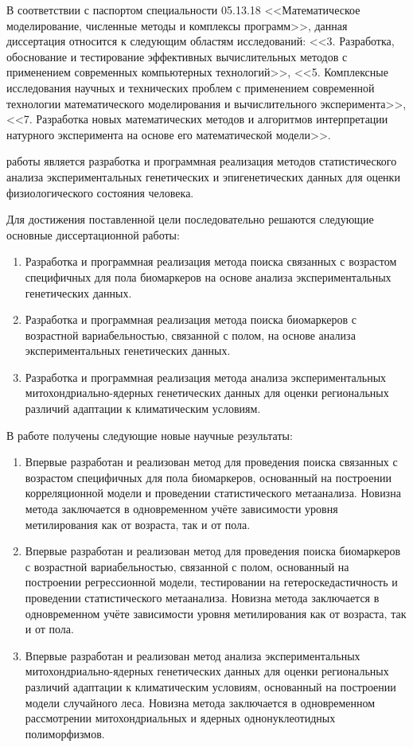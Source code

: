 В соответствии с паспортом специальности 05.13.18 <<Математическое моделирование, численные методы и комплексы программ>>, данная диссертация относится к следующим областям исследований: <<3. Разработка, обоснование и тестирование эффективных вычислительных методов с применением современных компьютерных технологий>>, <<5. Комплексные исследования научных и технических проблем с применением современной технологии математического моделирования и вычислительного эксперимента>>, <<7. Разработка новых математических методов и алгоритмов интерпретации натурного эксперимента на основе его математической модели>>.

{\aim} работы является разработка и программная реализация методов статистического анализа экспериментальных генетических и эпигенетических данных для оценки физиологического состояния человека.

Для достижения поставленной цели последовательно решаются следующие основные {\tasks} диссертационной работы:
\begin{enumerate}[beginpenalty=10000]
	\item Разработка и программная реализация метода поиска связанных с возрастом специфичных для пола биомаркеров на основе анализа экспериментальных генетических данных.
	\item Разработка и программная реализация метода поиска биомаркеров с возрастной вариабельностью, связанной с полом, на основе анализа экспериментальных генетических данных. 
	\item Разработка и программная реализация метода анализа экспериментальных митохондриально-ядерных генетических данных для оценки региональных различий адаптации к климатическим условиям. 
\end{enumerate}

{\novelty} В работе получены следующие новые научные результаты:
\begin{enumerate}[beginpenalty=10000] 
	\item Впервые разработан и реализован метод для проведения поиска связанных с возрастом специфичных для пола биомаркеров, основанный на построении корреляционной модели и проведении статистического метаанализа. Новизна метода заключается в одновременном учёте зависимости уровня метилирования как от возраста, так и от пола.
	\item Впервые разработан и реализован метод для проведения поиска биомаркеров с возрастной вариабельностью, связанной с полом, основанный на построении регрессионной модели, тестировании на гетероскедастичность и проведении статистического метаанализа. Новизна метода заключается в одновременном учёте зависимости уровня метилирования как от возраста, так и от пола. 
	\item Впервые разработан и реализован метод анализа экспериментальных митохондриально-ядерных генетических данных для оценки региональных различий адаптации к климатическим условиям, основанный на построении модели случайного леса. Новизна метода заключается в одновременном рассмотрении митохондриальных и ядерных однонуклеотидных полиморфизмов.
\end{enumerate}

